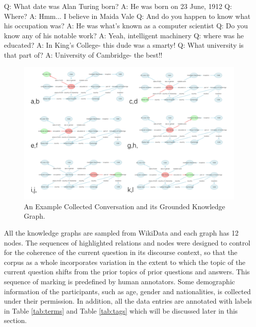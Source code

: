\documentclass[bsc,frontabs,twoside,singlespacing,parskip,deptreport]{infthesis}     %
\begin{document}
\begin{exe}
	\ex
		\begin{xlist}
			\ex \label{qq1} Q: What date was Alan Turing born?
			\ex \label{aa1} A: He was born on 23 June, 1912
			\ex \label{qq2} Q: Where?
			\ex \label{aa2} A: Hmm... I believe in Maida Vale
			\ex \label{qq3} Q: And do you happen to know what his occupation was?
			\ex \label{aa3} A: He was what's known as a computer scientist
			\ex \label{qq4} Q: Do you know any of his notable work?
			\ex \label{aa4} A: Yeah, intelligent machinery
			\ex \label{qq5} Q: where was he educated?
			\ex \label{aa5} A: In King's College- this dude was a smarty!
			\ex \label{qq6} Q: What university is that part of?
			\ex \label{aa6} A: University of Cambridge- the best!!
\end{xlist}
\end{exe}


\begin{figure}[h]
    \centering
    \includegraphics[width=\textwidth]{graphs.png}
    \caption{An Example Collected Conversation and its Grounded Knowledge Graph.}
    \label{fig:exampledata}
\end{figure}

All the knowledge graphs are sampled from WikiData\cite{vrandevcic2014wikidata} and each graph has 12 nodes. The sequences of highlighted relations and nodes were designed to control for the coherence of the current question in its discourse context, so that the corpus as a whole incorporates variation in the extent to which the topic of the current question shifts from the prior topics of prior questions and answers. This sequence of marking is predefined by human annotators. Some demographic information of the participants, such as age, gender and nationalities, is collected under their permission. In addition, all the data entries are annotated with labels in Table \ref{tab:terms} and Table \ref{tab:tags} which will be discussed later in this section.
\end{document}
